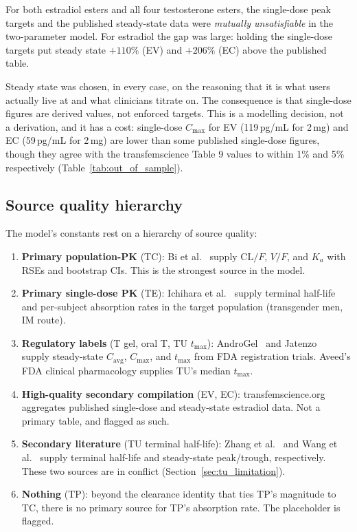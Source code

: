 \documentclass[11pt,a4paper]{article}
\begin{document}
For both estradiol esters and all four testosterone esters, the
single-dose peak targets and the published steady-state data were
\emph{mutually unsatisfiable} in the two-parameter model. For estradiol
the gap was large: holding the single-dose targets put steady state
$+110\%$ (EV) and $+206\%$ (EC) above the published table.

Steady state was chosen, in every case, on the reasoning that it is what
users actually live at and what clinicians titrate on. The consequence
is that single-dose figures are derived values, not enforced targets.
This is a modelling decision, not a derivation, and it has a cost:
single-dose $C_{\max}$ for EV (119\,pg/mL for 2\,mg) and EC (59\,pg/mL
for 2\,mg) are lower than some published single-dose figures, though
they agree with the transfemscience Table 9 values to within 1\% and
5\% respectively (Table~\ref{tab:out_of_sample}).

\subsection{Source quality hierarchy}
\label{sec:source_quality}

The model's constants rest on a hierarchy of source quality:

\begin{enumerate}[nosep,leftmargin=1.4em]
\item \textbf{Primary population-PK} (TC): Bi et al.~\cite{bi2018}
  supply $\mathrm{CL}/F$, $V/F$, and $K_a$ with RSEs and bootstrap CIs.
  This is the strongest source in the model.
\item \textbf{Primary single-dose PK} (TE): Ichihara et
  al.~\cite{ichihara2020} supply terminal half-life and per-subject
  absorption rates in the target population (transgender men, IM
  route).
\item \textbf{Regulatory labels} (T gel, oral T, TU $t_{\max}$):
  AndroGel~\cite{androgel} and Jatenzo~\cite{swerdloff2020} supply
  steady-state $C_{\mathrm{avg}}$, $C_{\max}$, and $t_{\max}$ from FDA
  registration trials. Aveed's FDA clinical pharmacology supplies TU's
  median $t_{\max}$.
\item \textbf{High-quality secondary compilation} (EV, EC):
  transfemscience.org~\cite{tfs} aggregates published single-dose and
  steady-state estradiol data. Not a primary table, and flagged as
  such.
\item \textbf{Secondary literature} (TU terminal half-life): Zhang et
  al.~\cite{zhang1998} and Wang et al.~\cite{wang2010} supply
  terminal half-life and steady-state peak/trough, respectively. These
  two sources are in conflict (Section~\ref{sec:tu_limitation}).
\item \textbf{Nothing} (TP): beyond the clearance identity that ties
  TP's magnitude to TC, there is no primary source for TP's absorption
  rate. The placeholder is flagged.
\end{enumerate}
\end{document}
